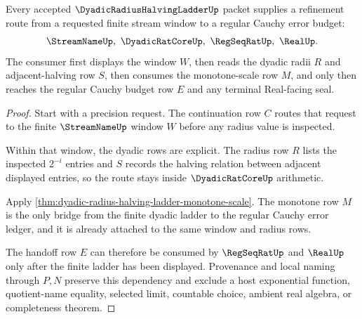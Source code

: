 \begin{theorem}
\label{thm:dyadic-radius-halving-ladder-refinement}
Every accepted $\DyadicRadiusHalvingLadderUp$ packet supplies a refinement route from a requested finite stream window to a regular Cauchy error budget:
$$
\StreamNameUp,\ \DyadicRatCoreUp,\ \RegSeqRatUp,\ \RealUp .
$$
The consumer first displays the window $W$, then reads the dyadic radii $R$ and adjacent-halving row $S$, then consumes the monotone-scale row $M$, and only then reaches the regular Cauchy budget row $E$ and any terminal Real-facing seal.
\end{theorem}
\begin{proof}
Start with a precision request. The continuation row $C$ routes that request to the finite $\StreamNameUp$ window $W$ before any radius value is inspected.

Within that window, the dyadic rows are explicit. The radius row $R$ lists the inspected $2^{-i}$ entries and $S$ records the halving relation between adjacent displayed entries, so the route stays inside $\DyadicRatCoreUp$ arithmetic.

Apply \autoref{thm:dyadic-radius-halving-ladder-monotone-scale}. The monotone row $M$ is the only bridge from the finite dyadic ladder to the regular Cauchy error ledger, and it is already attached to the same window and radius rows.

The handoff row $E$ can therefore be consumed by $\RegSeqRatUp$ and $\RealUp$ only after the finite ladder has been displayed. Provenance and local naming through $P,N$ preserve this dependency and exclude a host exponential function, quotient-name equality, selected limit, countable choice, ambient real algebra, or completeness theorem.
\end{proof}

